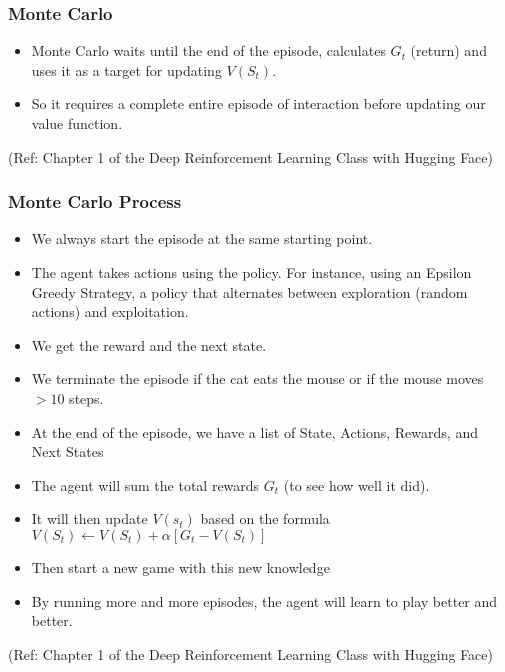 \begin{frame}[fragile]\frametitle{Monte Carlo}


\begin{itemize}
\item Monte Carlo waits until the end of the episode, calculates $G_t$ (return) and uses it as a target for updating $V(S_t)$.
\item So it requires a complete entire episode of interaction before updating our value function.
\end{itemize}

{\tiny (Ref: Chapter 1 of the Deep Reinforcement Learning Class with Hugging Face)}


\end{frame}

\begin{frame}[fragile]\frametitle{Monte Carlo Process}


\begin{itemize}
\item We always start the episode at the same starting point.
\item The agent takes actions using the policy. For instance, using an Epsilon Greedy Strategy, a policy that alternates between exploration (random actions) and exploitation.
\item We get the reward and the next state.
\item We terminate the episode if the cat eats the mouse or if the mouse moves $> 10$ steps.
\item At the end of the episode, we have a list of State, Actions, Rewards, and Next States
\item  The agent will sum the total rewards $G_t$ (to see how well it did).
\item It will then update $V(s_t)$ based on the formula $V(S_t) \leftarrow V(S_t) + \alpha [ G_t - V(S_t)]$
\item Then start a new game with this new knowledge
\item By running more and more episodes, the agent will learn to play better and better.
\end{itemize}


{\tiny (Ref: Chapter 1 of the Deep Reinforcement Learning Class with Hugging Face)}

\end{frame}

